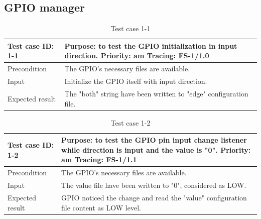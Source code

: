 \subsection{GPIO manager}
\begin{table}[H]
	\caption{Test case 1-1}
	\label{table:TCase-FS1-1}
	\begin{center}
		\renewcommand{\arraystretch}{1.8}
		\begin{tabu} 
			to 0.9 \textwidth
			{  X[0.3, l] X[l] }
			\toprule
			Test case ID: 1-1 & Purpose: to test the GPIO initialization in input direction. \newline Priority: am \newline Tracing: FS-1/1.0 \\ \midrule
			Precondition      & The GPIO's necessary files are available.                                                                     \\
			Input             & Initialize the GPIO itself with input direction.                                                              \\
			Expected result   & The "both" string have been written to "edge" configuration file.                                             \\ \bottomrule
		\end{tabu}
	\end{center}
\end{table} 

\begin{table}[H]
	\caption{Test case 1-2}
	\label{table:TCase-FS1-2}
	\begin{center}
		\renewcommand{\arraystretch}{1.8}
		\begin{tabu} 
			to 0.9 \textwidth
			{  X[0.3, l] X[l] }
			\toprule
			Test case ID: 1-2 & Purpose: to test the GPIO pin input change listener while direction is input and the value is "0". \newline Priority: am \newline Tracing: FS-1/1.1 \\ \midrule
			Precondition      & The GPIO's necessary files are available.                                                                                                           \\
			Input             & The value file have been written to "0", considered as LOW.                                                                                         \\
			Expected result   & GPIO noticed the change and read the "value" configuration file content as LOW level.                                                               \\ \bottomrule
		\end{tabu}
	\end{center}
\end{table} 

